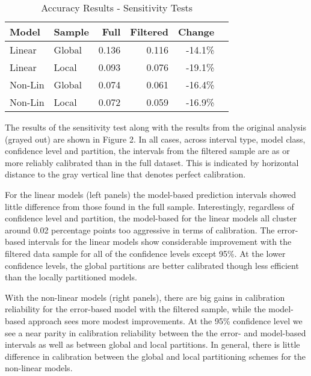 \documentclass[colTwo]{anon}
\theoremstyle{definition}
\begin{document}
\begin{table}[h]
\centering
\begin{tabular}{l|l|r|r|r|r}
\hline
\textbf{Model} & \textbf{Sample} & \textbf{Full} & \textbf{Filtered} & \textbf{Change}\\
\hline
Linear & Global & 0.136 & 0.116 & -14.1\% \\
Linear & Local & 0.093 & 0.076 & -19.1\% \\
\hline
Non-Lin & Global & 0.074 & 0.061 & -16.4\% \\
Non-Lin & Local & 0.072 & 0.059 & -16.9\% \\
\hline
\end{tabular}
\caption{Accuracy Results - Sensitivity Tests}
\label{table:7}
\end{table}

The results of the sensitivity test along with the results from the original analysis (grayed out) are shown in Figure 2.  In all cases, across interval type, model class, confidence level and partition, the intervals from the filtered sample are as or more reliably calibrated than in the full dataset. This is indicated by horizontal distance to the gray vertical line that denotes perfect calibration.  

For the linear models (left panels) the model-based prediction intervals showed little difference from those found in the full sample.  Interestingly, regardless of confidence level and partition, the model-based for the linear models all cluster around 0.02 percentage points too aggressive in terms of calibration.  The error-based intervals for the linear models show considerable improvement with the filtered data sample for all of the confidence levels except 95\%. At the lower confidence levels, the global partitions are better calibrated though less efficient than the locally partitioned models.

With the non-linear models (right panels), there are big gains in calibration reliability for the error-based model with the filtered sample, while the model-based approach sees more modest improvements.  At the 95\% confidence level we see a near parity in calibration reliability between the the error- and model-based intervals as well as between global and local partitions.  In general, there is little difference in calibration between the global and local partitioning schemes for the non-linear models.  
\end{document}
